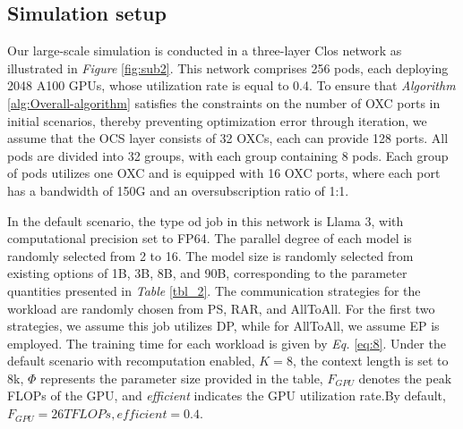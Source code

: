 \documentclass[conference]{IEEEtran}
\begin{document}
\subsection{Simulation setup}

Our large-scale simulation is conducted in a three-layer Clos network as illustrated in \emph{Figure} \ref{fig:sub2}. This network comprises 256 pods, each deploying 2048 A100 GPUs, whose utilization rate is equal to 0.4. To ensure that \emph{Algorithm} \ref{alg:Overall-algorithm} satisfies the constraints on the number of OXC ports in initial scenarios, thereby preventing optimization error through iteration, we assume that the OCS layer consists of 32 OXCs, each can provide 128 ports. All pods are divided into 32 groups, with each group containing 8 pods. Each group of pods utilizes one OXC and is equipped with 16 OXC ports, where each port has a bandwidth of 150G and an oversubscription ratio of 1:1.



In the default scenario, the type od job in this network is Llama 3, with computational precision set to FP64. The parallel degree of each model is randomly selected from 2 to 16. The model size is randomly selected from existing options of 1B, 3B, 8B, and 90B, corresponding to the parameter quantities presented in \emph{Table} \ref{tbl_2}. The communication strategies for the workload are randomly chosen from PS, RAR, and AllToAll. For the first two strategies, we assume this job utilizes DP, while for AllToAll, we assume EP is employed. The training time for each workload is given by \emph{Eq.} \eqref{eq:8}. Under the default scenario with recomputation enabled, $K = 8$, the context length is set to 8k, $\Phi$ represents the parameter size provided in the table, $F_{GPU}$ denotes the peak FLOPs of the GPU, and \textit{efficient} indicates the GPU utilization rate.By default, $F_{GPU}=26TFLOPs,efficient=0.4$.
\end{document}
